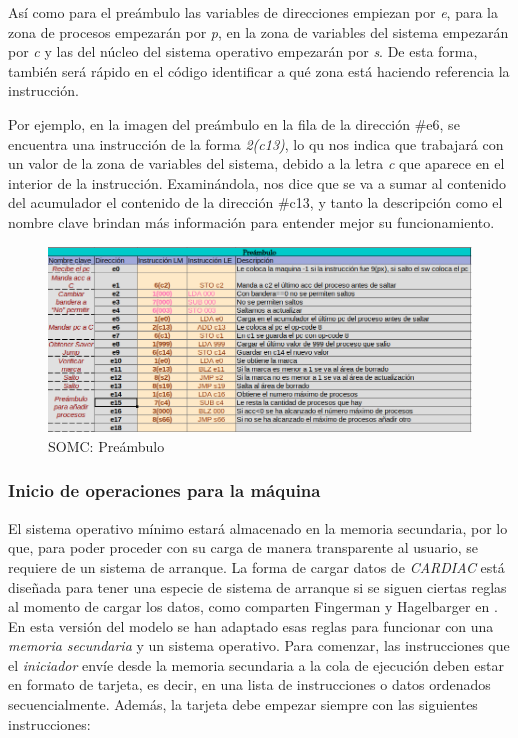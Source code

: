 \documentclass[letterpaper,12pt,oneside]{book}
\begin{document}
		Así como para el preámbulo las variables de direcciones empiezan por \textit{e}, para la zona de procesos empezarán por \textit{p},
		en la zona de variables del sistema empezarán por \textit{c} y las del núcleo del sistema operativo empezarán por \textit{s}. De esta forma,
		también será rápido en el código identificar a qué zona está haciendo referencia la instrucción. 
  
        Por ejemplo, en la imagen
		del preámbulo en la fila de la dirección \#e6, se encuentra una instrucción de la forma \textit{2(c13)}, lo qu nos indica
		que trabajará con un valor de la zona de variables del sistema, debido a la letra \textit{c} que aparece en el interior
		de la instrucción. Examinándola, nos dice que se va a sumar al contenido del acumulador el contenido de la dirección \#c13, y tanto
		la descripción como el nombre clave brindan más información para entender mejor su funcionamiento.
		
		\begin{figure}[h]		
			\centering
			\includegraphics[scale=0.45]{media/CARDIACC/Preambulo.png}
			\caption{SOMC: Preámbulo}
			\label{fig:somcPreambulo}
		\end{figure}
		
		\subsubsection{Inicio de operaciones para la máquina}
		
		El sistema operativo mínimo estará almacenado en la memoria secundaria, por lo que, para poder proceder con su carga de manera transparente al 
		usuario, se
		requiere de un sistema de arranque. La forma de cargar datos de \textit{CARDIAC} está diseñada para tener una
		especie de sistema de arranque si se siguen ciertas reglas al momento de cargar los datos, como
		comparten Fingerman y Hagelbarger en \cite{fingerman_instruction_1968}. En esta versión del modelo se han
		adaptado esas reglas para funcionar con una \textit{memoria secundaria} y un sistema operativo. Para comenzar,
		las instrucciones que el \textit{iniciador} envíe desde la memoria secundaria a la cola de 
		ejecución deben estar en formato de tarjeta, es decir, en una lista de instrucciones o datos ordenados secuencialmente. Además, la tarjeta 
		debe empezar siempre con las siguientes instrucciones:
\end{document}
